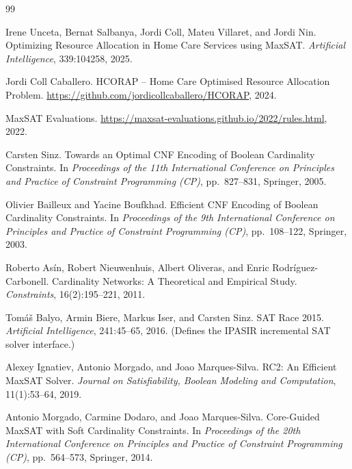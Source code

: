 \documentclass[11pt,a4paper]{article}
\begin{document}
\begin{thebibliography}{99}

Irene Unceta, Bernat Salbanya, Jordi Coll, Mateu Villaret, and Jordi Nin.
\newblock Optimizing Resource Allocation in Home Care Services using MaxSAT.
\newblock \emph{Artificial Intelligence}, 339:104258, 2025.

Jordi Coll Caballero.
\newblock HCORAP -- Home Care Optimised Resource Allocation Problem.
\newblock \url{https://github.com/jordicollcaballero/HCORAP}, 2024.

MaxSAT Evaluations.
\newblock \url{https://maxsat-evaluations.github.io/2022/rules.html}, 2022.

Carsten Sinz.
\newblock Towards an Optimal CNF Encoding of Boolean Cardinality Constraints.
\newblock In \emph{Proceedings of the 11th International Conference on
Principles and Practice of Constraint Programming (CP)},
pp.~827--831, Springer, 2005.

Olivier Bailleux and Yacine Boufkhad.
\newblock Efficient CNF Encoding of Boolean Cardinality Constraints.
\newblock In \emph{Proceedings of the 9th International Conference on
Principles and Practice of Constraint Programming (CP)},
pp.~108--122, Springer, 2003.

Roberto As\'in, Robert Nieuwenhuis, Albert Oliveras, and Enric
Rodr\'iguez-Carbonell.
\newblock Cardinality Networks: A Theoretical and Empirical Study.
\newblock \emph{Constraints}, 16(2):195--221, 2011.

Tom\'a\v{s} Balyo, Armin Biere, Markus Iser, and Carsten Sinz.
\newblock SAT Race 2015.
\newblock \emph{Artificial Intelligence}, 241:45--65, 2016.
\newblock (Defines the IPASIR incremental SAT solver interface.)

Alexey Ignatiev, Antonio Morgado, and Joao Marques-Silva.
\newblock RC2: An Efficient MaxSAT Solver.
\newblock \emph{Journal on Satisfiability, Boolean Modeling and Computation},
11(1):53--64, 2019.

Antonio Morgado, Carmine Dodaro, and Joao Marques-Silva.
\newblock Core-Guided MaxSAT with Soft Cardinality Constraints.
\newblock In \emph{Proceedings of the 20th International Conference on
Principles and Practice of Constraint Programming (CP)},
pp.~564--573, Springer, 2014.

\end{thebibliography}
\end{document}

